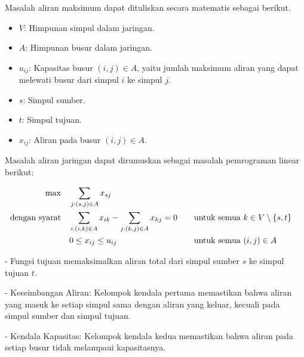 Masalah aliran maksimum dapat dituliskan secara matematis sebagai berikut.\\

\begin{itemize}
\item \( V \): Himpunan simpul dalam jaringan.
\item \( A \): Himpunan busur dalam jaringan.
\end{itemize}

\begin{itemize}
\item \( u_{ij} \): Kapasitas busur \( (i, j) \in A \), yaitu jumlah maksimum aliran yang dapat melewati busur dari simpul \( i \) ke simpul \( j \).
\item \( s \): Simpul sumber.
\item \( t \): Simpul tujuan.
\end{itemize}

\begin{itemize}
\item \( x_{ij} \): Aliran pada busur \( (i, j) \in A \).
\end{itemize}

Masalah aliran jaringan dapat dirumuskan sebagai masalah pemrograman linear berikut:

\begin{align*}
\max \quad & \sum_{j:(s, j) \in A} x_{sj} \\
\mbox{dengan syarat}\quad        & \sum_{i:(i, k) \in A} x_{ik} - \sum_{j:(k, j) \in A} x_{kj} = 0 &&\quad \mbox{untuk semua } k \in V \setminus \{s, t\} \\
& 0 \leq x_{ij} \leq u_{ij} &&\quad \mbox{untuk semua } (i, j) \in A
\end{align*}

- Fungsi tujuan memaksimalkan aliran total dari simpul sumber \( s \) ke simpul tujuan \( t \).

- Keseimbangan Aliran: Kelompok kendala pertama memastikan bahwa aliran yang masuk ke setiap simpul sama dengan aliran yang keluar, kecuali pada simpul sumber dan simpul tujuan.

- Kendala Kapasitas: Kelompok kendala kedua memastikan bahwa aliran pada setiap busur tidak melampaui kapasitasnya.

